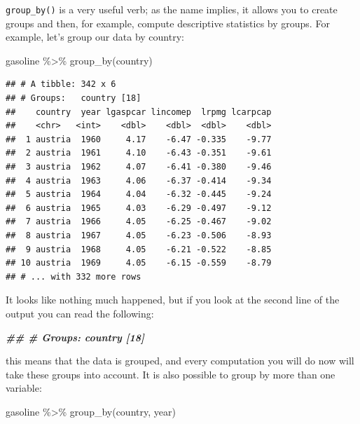 \documentclass[
]{article}
\newenvironment{Shaded}{\begin{snugshade}}{\end{snugshade}}
\newcommand{\DocumentationTok}[1]{\textcolor[rgb]{0.56,0.35,0.01}{\textbf{\textit{#1}}}}
\newcommand{\FunctionTok}[1]{\textcolor[rgb]{0.00,0.00,0.00}{#1}}
\newcommand{\NormalTok}[1]{#1}
\newcommand{\SpecialCharTok}[1]{\textcolor[rgb]{0.00,0.00,0.00}{#1}}
\begin{document}
\texttt{group\_by()} is a very useful verb; as the name implies, it allows you to create groups and then,
for example, compute descriptive statistics by groups. For example, let's group our data by
country:

\begin{Shaded}
\begin{Highlighting}[]
\NormalTok{gasoline }\SpecialCharTok{\%\textgreater{}\%}
  \FunctionTok{group\_by}\NormalTok{(country)}
\end{Highlighting}
\end{Shaded}

\begin{verbatim}
## # A tibble: 342 x 6
## # Groups:   country [18]
##    country  year lgaspcar lincomep  lrpmg lcarpcap
##    <chr>   <int>    <dbl>    <dbl>  <dbl>    <dbl>
##  1 austria  1960     4.17    -6.47 -0.335    -9.77
##  2 austria  1961     4.10    -6.43 -0.351    -9.61
##  3 austria  1962     4.07    -6.41 -0.380    -9.46
##  4 austria  1963     4.06    -6.37 -0.414    -9.34
##  5 austria  1964     4.04    -6.32 -0.445    -9.24
##  6 austria  1965     4.03    -6.29 -0.497    -9.12
##  7 austria  1966     4.05    -6.25 -0.467    -9.02
##  8 austria  1967     4.05    -6.23 -0.506    -8.93
##  9 austria  1968     4.05    -6.21 -0.522    -8.85
## 10 austria  1969     4.05    -6.15 -0.559    -8.79
## # ... with 332 more rows
\end{verbatim}

It looks like nothing much happened, but if you look at the second line of the output you can read
the following:

\begin{Shaded}
\begin{Highlighting}[]
\DocumentationTok{\#\# \# Groups:   country [18]}
\end{Highlighting}
\end{Shaded}

this means that the data is grouped, and every computation you will do now will take these groups
into account. It is also possible to group by more than one variable:

\begin{Shaded}
\begin{Highlighting}[]
\NormalTok{gasoline }\SpecialCharTok{\%\textgreater{}\%}
  \FunctionTok{group\_by}\NormalTok{(country, year)}
\end{Highlighting}
\end{Shaded}
\end{document}

